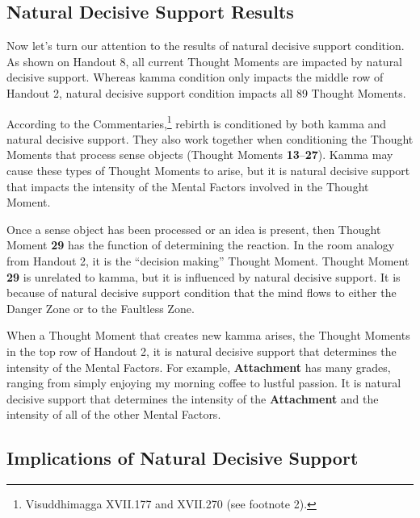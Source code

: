 \subsection*{Natural Decisive Support Results}

Now let’s turn our attention to the results of natural decisive support condition. As shown on Handout 8, all current Thought Moments are impacted by natural decisive support. Whereas kamma condition only impacts the middle row of Handout 2, natural decisive support condition impacts all 89 Thought Moments.

According to the Commentaries,\footnote{Visuddhimagga XVII.177 and XVII.270 (see footnote 2).} rebirth is conditioned by both kamma and natural decisive support. They also work together when conditioning the Thought Moments that process sense objects (Thought Moments \textbf{13}--\textbf{27}). Kamma may cause these types of Thought Moments to arise, but it is natural decisive support that impacts the intensity of the Mental Factors involved in the Thought Moment.

Once a sense object has been processed or an idea is present, then Thought Moment \textbf{29} has the function of determining the reaction. In the room analogy from Handout 2, it is the “decision making” Thought Moment. Thought Moment \textbf{29} is unrelated to kamma, but it is influenced by natural decisive support. It is because of natural decisive support condition that the mind flows to either the Danger Zone or to the Faultless Zone.

When a Thought Moment that creates new kamma arises, the Thought Moments in the top row of Handout 2, it is natural decisive support that determines the intensity of the Mental Factors. For example, \textbf{Attachment} has many grades, ranging from simply enjoying my morning coffee to lustful passion. It is natural decisive support that determines the intensity of the \textbf{Attachment} and the intensity of all of the other Mental Factors.

\subsection*{Implications of Natural Decisive Support}

